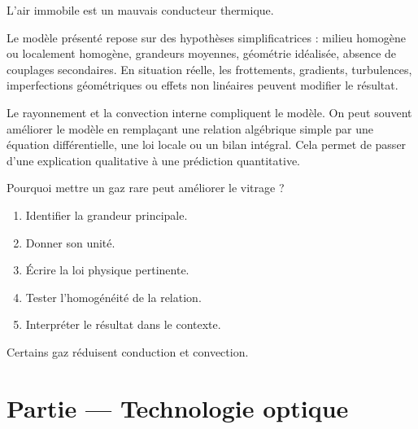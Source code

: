 \documentclass[11pt,a4paper]{article}
\begin{document}
\begin{odgbox}
L'air immobile est un mauvais conducteur thermique.
\end{odgbox}

\begin{attentionbox}
Le modèle présenté repose sur des hypothèses simplificatrices : milieu homogène ou localement homogène, grandeurs moyennes, géométrie idéalisée, absence de couplages secondaires. En situation réelle, les frottements, gradients, turbulences, imperfections géométriques ou effets non linéaires peuvent modifier le résultat.
\end{attentionbox}

\begin{approfondissementbox}
Le rayonnement et la convection interne compliquent le modèle.
On peut souvent améliorer le modèle en remplaçant une relation algébrique simple par une équation différentielle, une loi locale ou un bilan intégral. Cela permet de passer d'une explication qualitative à une prédiction quantitative.
\end{approfondissementbox}

\begin{exercicebox}
Pourquoi mettre un gaz rare peut améliorer le vitrage ?
\begin{enumerate}
  \item Identifier la grandeur principale.
  \item Donner son unité.
  \item Écrire la loi physique pertinente.
  \item Tester l'homogénéité de la relation.
  \item Interpréter le résultat dans le contexte.
\end{enumerate}
\end{exercicebox}

\begin{corrigebox}[Indication]
Certains gaz réduisent conduction et convection.
\end{corrigebox}


\section{Partie — Technologie optique}


\end{document}
